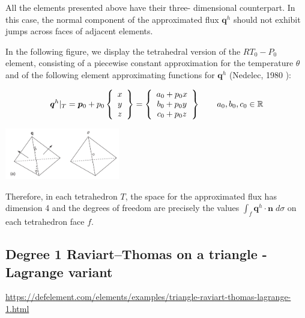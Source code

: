 \begin{itemize}
\begin{displayquote}
{All the elements presented above have their three-
dimensional counterpart. In this case, the normal component
of the approximated flux ${\bm q}^h$ should not exhibit jumps across
faces of adjacent elements.

In the following figure, we display the tetrahedral version of the
$RT_0-P_0$ element, consisting of a piecewise
constant approximation for the temperature $\theta$ and of the
following element approximating functions for ${\bm q}^h$ (Nedelec,
1980 \cite{nede80}):

\[
{\bm q}^h|_T = {\bm p}_0
+p_0
\left\{\begin{array}{c}
x\\y\\z
\end{array}\right\}
=
\left\{\begin{array}{c}
a_0+p_0x\\ 
b_0+p_0y\\
c_0+p_0z 
\end{array}\right\}
\qquad
a_0,b_0,c_0 \in {\mathbb{R}}
\]

\begin{center}
\includegraphics[width=5cm]{images/pair_raviart-thomas/aubb17c}
\end{center}

Therefore, in each tetrahedron $T$, the space for the approximated 
flux has dimension 4 and the degrees of freedom are
precisely the values $\int_f {\bm q}^h\cdot {\bm n}\; d\sigma$ 
on each tetrahedron face $f$.



}
\end{displayquote}


\end{itemize} %


\subsection{Degree 1 Raviart–Thomas on a triangle - Lagrange variant}

\url{https://defelement.com/elements/examples/triangle-raviart-thomas-lagrange-1.html}

